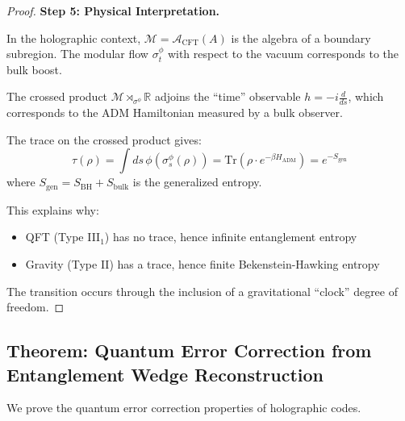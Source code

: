 \documentclass[12pt,a4paper]{article}
\begin{document}
\begin{proof}
\textbf{Step 5: Physical Interpretation.}

In the holographic context, $\mathcal{M} = \mathcal{A}_{\text{CFT}}(A)$ is the algebra of a boundary subregion. The modular flow $\sigma_t^\phi$ with respect to the vacuum corresponds to the bulk boost.

The crossed product $\mathcal{M} \rtimes_{\sigma^\phi} \mathbb{R}$ adjoins the ``time'' observable $h = -i\frac{d}{ds}$, which corresponds to the ADM Hamiltonian measured by a bulk observer.

The trace on the crossed product gives:
\begin{equation}
\tau(\rho) = \int ds \, \phi(\sigma_s^\phi(\rho)) = \text{Tr}(\rho \cdot e^{-\beta H_{\text{ADM}}}) = e^{-S_{\text{gen}}}
\end{equation}
where $S_{\text{gen}} = S_{\text{BH}} + S_{\text{bulk}}$ is the generalized entropy.

This explains why:
\begin{itemize}
    \item QFT (Type III$_1$) has no trace, hence infinite entanglement entropy
    \item Gravity (Type II) has a trace, hence finite Bekenstein-Hawking entropy
\end{itemize}

The transition occurs through the inclusion of a gravitational ``clock'' degree of freedom.
\end{proof}

\subsection{Theorem: Quantum Error Correction from Entanglement Wedge Reconstruction}

We prove the quantum error correction properties of holographic codes.
\end{document}
